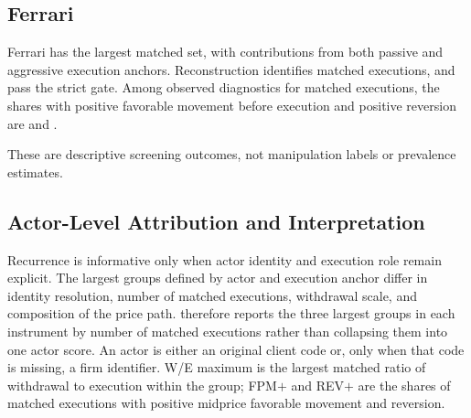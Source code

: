 \documentclass[11pt]{article}
\newenvironment{review}{\begingroup\color{blue}}{\endgroup}
\begin{document}
\subsection{Ferrari}
\label{subsec:ferrari_results}

Ferrari has the largest matched set, with contributions from both passive and aggressive execution anchors.
Reconstruction identifies \FerrariMatchedClusters{} matched executions, and \FerrariCompatibleSequences{} pass the strict
gate. Among \begin{review}observed diagnostics for matched executions\end{review}, the shares with \begin{review}positive favorable movement before execution\end{review} and positive
reversion are \FerrariFPMShare{} and \FerrariREVShare{}.

These are descriptive screening outcomes, not manipulation labels or prevalence estimates.

\subsection{Actor-Level Attribution and Interpretation}
\label{subsec:actor_level_results}

Recurrence is informative only when actor identity and execution role remain explicit. \begin{review}The largest groups defined by actor and execution anchor differ in identity resolution, number of matched executions, withdrawal scale, and composition of the price path.\end{review} 
therefore reports the three largest groups in each instrument \begin{review}by number of matched executions\end{review} rather than collapsing them into one
actor score. An actor is either an original client code or, only when that code is missing, a firm identifier. W/E maximum is
the largest matched \begin{review}ratio of withdrawal to execution\end{review} within the group; FPM$+$ and REV$+$ are the shares of matched executions with
positive midprice favorable movement and reversion.

\FloatBarrier
\end{document}
